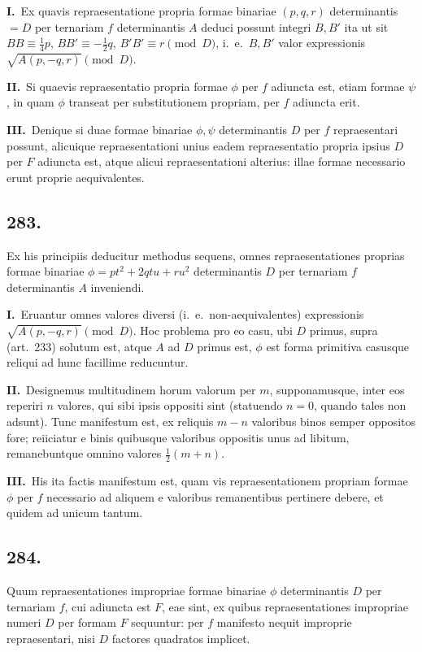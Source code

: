 \documentclass[12pt,a4paper]{article}
\theoremstyle{plain}
\theoremstyle{definition}
\theoremstyle{remark}
\begin{document}
\textbf{I.}\ Ex quavis repraesentatione propria formae binariae $(p, q, r)$ determinantis $= D$ per ternariam $f$ determinantis $A$ deduci possunt integri $B, B'$ ita ut sit $BB \equiv \frac{1}{4}p$, $BB' \equiv -\frac{1}{2}q$, $B'B' \equiv r \pmod{D}$, i.\ e.\ $B, B'$ valor expressionis $\sqrt{A(p, -q, r)} \pmod{D}$.

\textbf{II.}\ Si quaevis repraesentatio propria formae $\phi$ per $f$ adiuncta est, etiam formae $\psi$, in quam $\phi$ transeat per substitutionem propriam, per $f$ adiuncta erit.

\textbf{III.}\ Denique si duae formae binariae $\phi, \psi$ determinantis $D$ per $f$ repraesentari possunt, alicuique repraesentationi unius eadem repraesentatio propria ipsius $D$ per $F$ adiuncta est, atque alicui repraesentationi alterius: illae formae necessario erunt proprie aequivalentes.

\subsection*{283.}

Ex his principiis deducitur methodus sequens, omnes repraesentationes proprias formae binariae $\phi = pt^2 + 2qtu + ru^2$ determinantis $D$ per ternariam $f$ determinantis $A$ inveniendi.

\textbf{I.}\ Eruantur omnes valores diversi (i.\ e.\ non-aequivalentes) expressionis $\sqrt{A(p, -q, r)} \pmod{D}$. Hoc problema pro eo casu, ubi $D$ primus, supra (art.\ 233) solutum est, atque $A$ ad $D$ primus est, $\phi$ est forma primitiva casusque reliqui ad hunc facillime reducuntur.

\textbf{II.}\ Designemus multitudinem horum valorum per $m$, supponamusque, inter eos reperiri $n$ valores, qui sibi ipsis oppositi sint (statuendo $n = 0$, quando tales non adsunt). Tunc manifestum est, ex reliquis $m - n$ valoribus binos semper oppositos fore; reiiciatur e binis quibusque valoribus oppositis unus ad libitum, remanebuntque omnino valores $\frac{1}{2}(m + n)$.

\textbf{III.}\ His ita factis manifestum est, quam vis repraesentationem propriam formae $\phi$ per $f$ necessario ad aliquem e valoribus remanentibus pertinere debere, et quidem ad unicum tantum.

\subsection*{284.}

Quum repraesentationes impropriae formae binariae $\phi$ determinantis $D$ per ternariam $f$, cui adiuncta est $F$, eae sint, ex quibus repraesentationes impropriae numeri $D$ per formam $F$ sequuntur: per $f$ manifesto nequit improprie repraesentari, nisi $D$ factores quadratos implicet.
\end{document}
